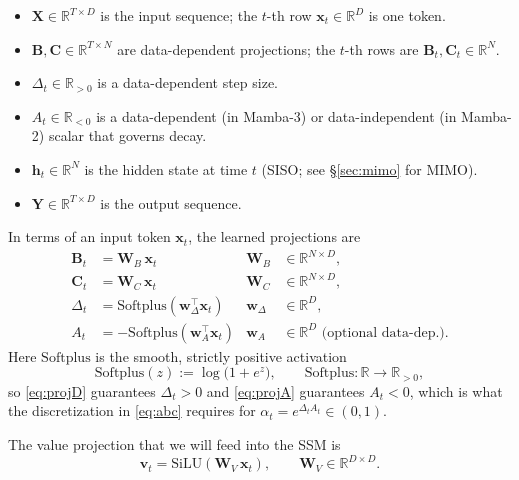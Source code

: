 \documentclass[11pt,a4paper]{article}
\begin{document}
\begin{itemize}
  \item $\bm{X} \in \mathbb{R}^{T\times D}$ is the input sequence;
        the $t$-th row $\bm{x}_t \in \mathbb{R}^{D}$ is one token.
  \item $\bm{B}, \bm{C} \in \mathbb{R}^{T\times N}$ are data-dependent
        projections; the $t$-th rows are $\bm{B}_t, \bm{C}_t \in
        \mathbb{R}^{N}$.
  \item $\Delta_t \in \mathbb{R}_{>0}$ is a data-dependent step size.
  \item $A_t \in \mathbb{R}_{<0}$ is a data-dependent (in Mamba-3) or
        data-independent (in Mamba-2) scalar that governs decay.
  \item $\bm{h}_t \in \mathbb{R}^{N}$ is the hidden state at time $t$
        (SISO; see \S\ref{sec:mimo} for MIMO).
  \item $\bm{Y} \in \mathbb{R}^{T\times D}$ is the output sequence.
\end{itemize}

In terms of an input token $\bm{x}_t$, the learned projections are
\begin{align}
  \bm{B}_t       &= \bm{W}_B\,\bm{x}_t  & \bm{W}_B &\in \mathbb{R}^{N\times D}, \label{eq:projB}\\
  \bm{C}_t       &= \bm{W}_C\,\bm{x}_t  & \bm{W}_C &\in \mathbb{R}^{N\times D}, \label{eq:projC}\\
  \Delta_t       &= \mathrm{Softplus}(\bm{w}_\Delta^\top \bm{x}_t)
                                         & \bm{w}_\Delta &\in \mathbb{R}^{D}, \label{eq:projD}\\
  A_t            &= -\mathrm{Softplus}(\bm{w}_A^\top \bm{x}_t)
                                         & \bm{w}_A &\in \mathbb{R}^{D} \text{ (optional data-dep.)}. \label{eq:projA}
\end{align}
Here $\mathrm{Softplus}$ is the smooth, strictly positive activation
\begin{equation}\label{eq:softplus}
  \mathrm{Softplus}(z) := \log\bigl(1 + e^{z}\bigr),
  \qquad \mathrm{Softplus}:\mathbb{R}\to\mathbb{R}_{>0},
\end{equation}
so \eqref{eq:projD} guarantees $\Delta_t > 0$ and \eqref{eq:projA}
guarantees $A_t < 0$, which is what the discretization in
\eqref{eq:abc} requires for $\alpha_t = e^{\Delta_t A_t} \in (0,1)$.

The value projection that we will feed into the SSM is
\begin{equation}\label{eq:projV}
  \bm{v}_t = \mathrm{SiLU}(\bm{W}_V\,\bm{x}_t),
  \qquad \bm{W}_V \in \mathbb{R}^{D\times D}.
\end{equation}
\end{document}
